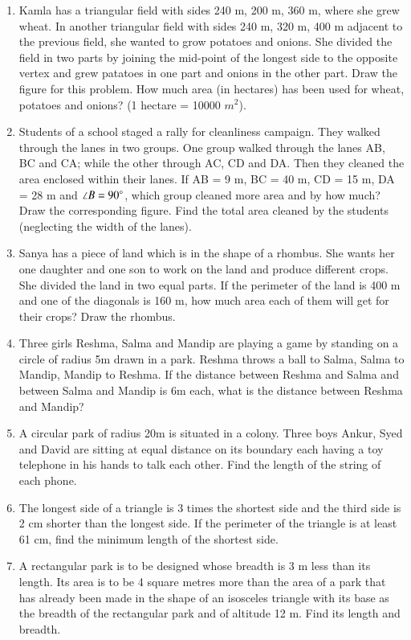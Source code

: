 \begin{enumerate}[label=\arabic*.,ref=\thesubsection.\theenumi]
\item Kamla has a triangular field with sides 240 m, 200 m, 360 m, where she grew wheat. In another triangular field with sides 240 m, 320 m, 400 m adjacent to the previous field, she wanted to grow potatoes and onions. She divided the field in two parts by joining the mid-point of the longest side to the opposite vertex and grew patatoes in one part and onions in the other part. Draw the figure for this problem.  How much area (in hectares) has been used for wheat, potatoes and onions? (1 hectare = 10000 $m^2$).
\item Students of a school staged a rally for cleanliness campaign. They walked through the lanes in two groups. One group walked through the lanes AB, BC and CA; while the other through AC, CD and DA. Then they cleaned the area enclosed within their lanes. If AB = 9 m, BC = 40 m, CD = 15 m, DA = 28 m and $\angle B = 90\degree$, which group cleaned more area and by how much? Draw the corresponding figure.  Find the total area cleaned by the students (neglecting the width of the lanes). 
%
\item Sanya has a piece of land which is in the shape of a rhombus. She wants her one daughter and one son to work on the land and produce different crops. She divided the land in two equal parts. If the perimeter of the land is 400 m and one of the diagonals is 160 m, how much area each of them will get for their crops? Draw the rhombus.
%
\item Three girls Reshma, Salma and Mandip are playing a game by standing on a circle of radius 5m drawn in a park. Reshma throws a ball to Salma, Salma to Mandip, Mandip to Reshma. If the distance between Reshma and Salma and between Salma and Mandip is 6m each, what is the distance between Reshma and Mandip?
\item A circular park of radius 20m is situated in a colony. Three boys Ankur, Syed and David are sitting at equal distance on its boundary each having a toy telephone in his hands to talk each other. Find the length of the string of each phone.
    \item The longest side of a triangle is 3 times the shortest side and the third side is 2 cm shorter than the longest side. If the perimeter of the triangle is at least 61 cm, find the minimum length of the shortest side.
\item A rectangular park is to be designed whose breadth is 3 m less than its length. Its area is to be 4 square metres more than the area of a park that has already been made in the shape of an isosceles triangle with its base as the breadth of the rectangular park and of altitude 12 m. Find its length and breadth.

\end{enumerate}
